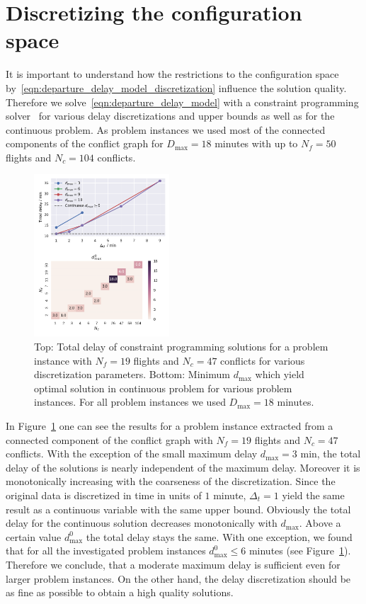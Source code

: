 \section{Discretizing the configuration space}
It is important to understand how the restrictions to the configuration space by~\eqref{eqn:departure_delay_model_discretization} influence the solution quality.
Therefore we solve~\eqref{eqn:departure_delay_model} with a constraint programming solver~\cite{numberjack} for various delay discretizations and upper bounds as well as for the continuous problem.
As problem instances we used most of the connected components of the conflict graph for $D_\text{max}=18$ minutes with up to $N_f=50$ flights and $N_c=104$ conflicts.
\begin{figure}[htpb]
    \centering
    \includegraphics[width=0.45\textwidth]{./pics/delay_only_cp_results.pdf}
    \caption{Top: Total delay of constraint programming solutions for a problem instance with $N_f=19$ flights and $N_c=47$ conflicts for various discretization parameters.
    Bottom: Minimum $d_\text{max}$ which yield optimal solution in continuous problem for various problem instances. For all problem instances we used $D_\text{max}=18$ minutes.}
\label{fig:delay_only_cp_results}
\end{figure}

In Figure~\ref{fig:delay_only_cp_results} one can see the results for a problem instance extracted from a connected component of the conflict graph with $N_f=19$ flights and $N_c=47$ conflicts.
With the exception of the small maximum delay $d_\text{max} = 3$ min, the total delay of the solutions is nearly independent of the maximum delay.
Moreover it is monotonically increasing with the coarseness of the discretization.
Since the original data is discretized in time in units of $1$ minute, $\Delta_t=1$ yield the same result as a continuous variable with the same upper bound.
Obviously the total delay for the continuous solution decreases monotonically with $d_\text{max}$.
Above a certain value $d^0_\text{max}$ the total delay stays the same.
With one exception, we found that for all the investigated problem instances $d^0_\text{max}\leq6$ minutes (see Figure~\ref{fig:delay_only_cp_results}).
Therefore we conclude, that a moderate maximum delay is sufficient even for larger problem instances.
On the other hand, the delay discretization should be as fine as possible to obtain a high quality solutions.
